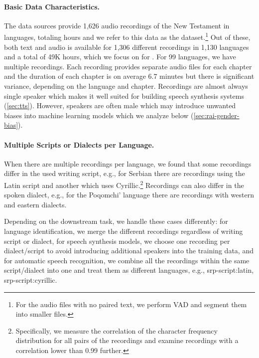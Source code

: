 \paragraph{Basic Data Characteristics.}
The data sources provide 1,626 audio recordings of the New Testament in \nummmsulang{} languages, totaling \nummmsuhrs{} hours and we refer to this data as the \MMSU{} dataset.\footnote{For the audio files with no paired text, we perform VAD and segment them into smaller files.}
Out of these, both text and audio is available for 1,306 different recordings in 1,130 languages and a total of 49K hours, which we focus on for \MMS{}.
For 99 languages, we have multiple recordings.
Each recording provides separate audio files for each chapter and the duration of each chapter is on average 6.7 minutes but there is significant variance, depending on the language and chapter.
Recordings are almost always single speaker which makes it well suited for building speech synthesis systems (\textsection\ref{sec:tts}).
However, speakers are often male which may introduce unwanted biases into machine learning models which we analyze below (\textsection\ref{sec:rai-gender-bias}).


\paragraph{Multiple Scripts or Dialects per Language.}
When there are multiple recordings per language, we found that some recordings differ in the used writing script, e.g., for Serbian there are recordings using the Latin script and another which uses Cyrillic.\footnote{Specifically, we measure the correlation of the character frequency distribution for all pairs of the recordings and examine recordings with a correlation lower than 0.99 further.}
Recordings can also differ in the spoken dialect, e.g., for the Poqomchi' language there are recordings with western and eastern dialects. 

Depending on the downstream task, we handle these cases differently: for language identification, we merge the different recordings regardless of writing script or dialect, for speech synthesis models, we choose one recording per dialect/script to avoid introducing additional speakers into the training data, and for automatic speech recognition, we combine all the recordings within the same script/dialect into one and treat them as different languages, e.g., srp-script:latin, srp-script:cyrillic.


